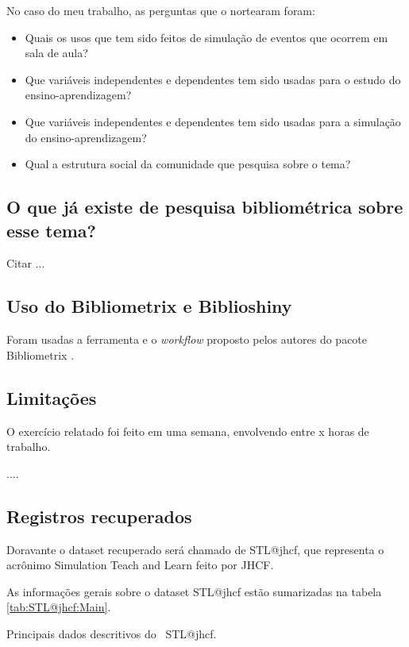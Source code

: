 
No caso do meu trabalho, as perguntas que o nortearam foram:
\begin{itemize}
    \item Quais os usos que tem sido feitos de simulação de eventos que ocorrem em sala de aula? 
    \item Que variáveis independentes e dependentes tem sido usadas para o estudo do ensino-aprendizagem? 
    \item Que variáveis independentes e dependentes tem sido usadas para a simulação do ensino-aprendizagem? 
    \item Qual a estrutura social da comunidade que pesquisa sobre o tema?
\end{itemize}

\subsection{O que já existe de pesquisa bibliométrica sobre esse tema?}

Citar ...

\subsection{Uso do Bibliometrix e Biblioshiny}

Foram usadas a ferramenta e o \textit{workflow} proposto pelos autores do pacote Bibliometrix \cite{aria_bibliometrix_2017}.

\subsection{Limitações} O exercício relatado foi feito em uma semana, envolvendo entre x horas de trabalho.

....

\subsection{Registros recuperados}

Doravante o dataset recuperado será chamado de STL@jhcf, que representa o acrônimo Simulation Teach and Learn feito por JHCF.

As informações gerais sobre o dataset STL@jhcf estão sumarizadas na tabela \ref{tab:STL@jhcf:Main}.

\begin{table}[htp]
    \centering
{}
    \caption{Principais dados descritivos do \dataset\ STL@jhcf.}
    \label{tab:STL@jhcf:Main}
\end{table}

